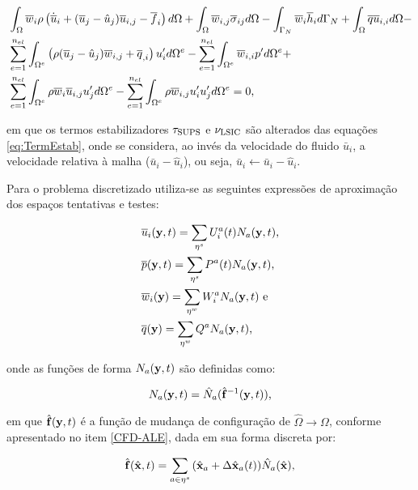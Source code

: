 \documentclass[_ArquivoPrincipal.tex]{subfiles}
\begin{document}
\begin{equation}
    \begin{split}
        &\int_{\Omega}{\overline{w}_i\rho\left({\dot{\overline{u}}_i+(\overline{u}_j-\hat{u}_j)\overline{u}_{i,j}-\overline{f}_i}\right) d\Omega}+\int_{\Omega}{\overline{w}_{i,j}\overline{\sigma}_{ij} d\Omega}-\int_{\Gamma_N}{\overline{w}_i\overline{h}_i d\Gamma_N}+\int_{\Omega}{\overline{q}\overline{u}_{i,i} d\Omega}-\\
        &\sum_{e=1}^{n_{el}}{\int_{\Omega^e}{\left({\rho(\overline{u}_j-\hat{u}_j)\overline{w}_{i,j}+\overline{q}_{,i}}\right)u'_i d\Omega^e}}-\sum_{e=1}^{n_{el}}{\int_{\Omega^e}{\overline{w}_{i,i}p' d\Omega^e}}+\\
        &\sum_{e=1}^{n_{el}}{\int_{\Omega^e}{\rho\overline{w}_i\overline{u}_{i,j}u'_j d\Omega^e}}-\sum_{e=1}^{n_{el}}{\int_{\Omega^e}{\rho\overline{w}_{i,j}u'_iu'_j d\Omega^e}}=0
        \text{,}
        \label{eq:RBVMS-ALE}
    \end{split}
\end{equation}

\noindent em que os termos estabilizadores $\tau_{\mathrm{SUPS}}$ e $\nu_{\mathrm{LSIC}}$ são alterados das equações \ref{eq:TermEstab}, onde se considera, ao invés da velocidade do fluido $\bar{u}_i$, a velocidade relativa à malha ($\bar{u}_i-\hat{u}_i$), ou seja, $\bar{u}_i\gets\bar{u}_i-\hat{u}_i$.

Para o problema discretizado utiliza-se as seguintes expressões de aproximação dos espaços tentativas e testes:

\begin{subequations}
    \begin{align}
         & \overline{u}_i(\mathbf{y},t)=\sum_{\mathbf{\eta}^s}{U_i^a(t)N_a(\mathbf{y},t)}\text{,} \\
         & \overline{p}(\mathbf{y},t)=\sum_{\mathbf{\eta}^s}{P^a(t)N_a(\mathbf{y},t)}\text{,}     \\
         & \overline{w}_i(\mathbf{y})=\sum_{\mathbf{\eta}^w}{W_i^aN_a(\mathbf{y},t)}\text{ e}     \\
         & \overline{q}(\mathbf{y})=\sum_{\mathbf{\eta}^w}{Q^aN_a(\mathbf{y},t)}\text{,}
    \end{align}
\end{subequations}

\noindent onde as funções de forma $N_a(\mathbf{y},t)$ são definidas como:

\begin{equation}
    N_a(\mathbf{y},t)=\hat{N}_a(\hat{\mathbf{f}}^{-1}(\mathbf{y},t))\text{,}
\end{equation}

\noindent em que $\hat{\mathbf{f}}(\mathbf{y},t)$ é a função de mudança de configuração de $\hat{\Omega}\to\Omega$, conforme apresentado no item \ref{CFD-ALE}, dada em sua forma discreta por:

\begin{equation}
    \hat{\mathbf{f}}(\hat{\mathbf{x}},t)=\sum_{a\in\mathbf{\eta}^s}{(\hat{\mathbf{x}}_a+\Delta\hat{\mathbf{x}}_a(t))\hat{N}_a(\hat{\mathbf{x}})}\text{,}
\end{equation}
\end{document}
